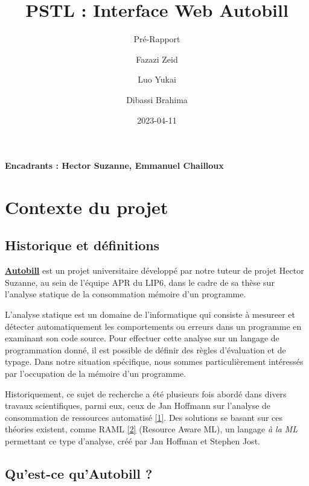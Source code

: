 \documentclass[
  12pt,
]{article}
\title{PSTL : Interface Web Autobill}
\subtitle{Pré-Rapport}
\author{Fazazi Zeid \and Luo Yukai \and Dibassi Brahima}
\date{2023-04-11}
\begin{document}
\maketitle

\textbf{Encadrants : Hector Suzanne, Emmanuel Chailloux} \newpage

{
\hypersetup{linkcolor=}
\setcounter{tocdepth}{3}
\tableofcontents
}
\newpage

\hypertarget{contexte-du-projet}{%
\section{Contexte du projet}\label{contexte-du-projet}}

\hypertarget{historique-et-duxe9finitions}{%
\subsection{Historique et
définitions}\label{historique-et-duxe9finitions}}

\href{https://gitlab.lip6.fr/suzanneh/autobill}{\textbf{Autobill}} est
un projet universitaire développé par notre tuteur de projet Hector
Suzanne, au sein de l'équipe APR du LIP6, dans le cadre de sa thèse sur
l'analyse statique de la consommation mémoire d'un programme.

L'analyse statique est un domaine de l'informatique qui consiste à
mesureer et détecter automatiquement les comportements ou erreurs dans
un programme en examinant son code source. Pour effectuer cette analyse
sur un langage de programmation donné, il est possible de définir des
règles d'évaluation et de typage. Dans notre situation spécifique, nous
sommes particulièrement intéressés par l'occupation de la mémoire d'un
programme.

Historiquement, ce sujet de recherche a été plusieurs fois abordé dans
divers travaux scientifiques, parmi eux, ceux de Jan Hoffmann sur
l'analyse de consommation de ressources automatisé
\protect\hyperlink{ref-Hoffmann}{{[}1{]}}. Des solutions se basant sur
ces théories existent, comme RAML \protect\hyperlink{biblio}{{[}2{]}}
(Resource Aware ML), un langage \emph{à la ML} permettant ce type
d'analyse, créé par Jan Hoffman et Stephen Jost.

\hypertarget{quest-ce-quautobill}{%
\subsection{Qu'est-ce qu'Autobill ?}\label{quest-ce-quautobill}}
\end{document}
